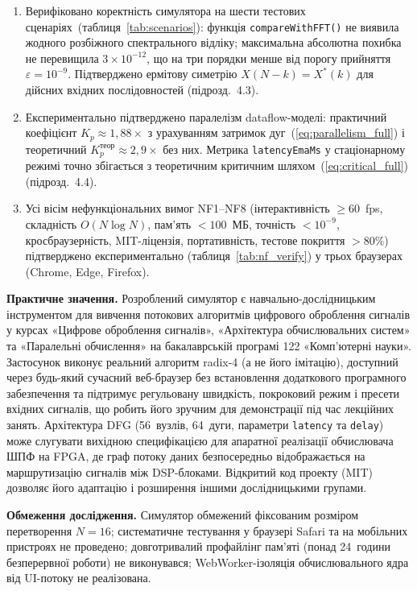 \begin{enumerate}
  \item Верифіковано коректність симулятора на шести тестових
    сценаріях~(таблиця~\ref{tab:scenarios}): функція \texttt{compareWithFFT()}
    не виявила жодного розбіжного спектрального відліку; максимальна
    абсолютна похибка не перевищила $3 \times 10^{-12}$, що на три порядки
    менше від порогу прийняття $\varepsilon = 10^{-9}$. Підтверджено
    ермітову симетрію $X(N-k) = X^*(k)$ для дійсних вхідних послідовностей
    (підрозд.~4.3).

  \item Експериментально підтверджено паралелізм dataflow-моделі: практичний
    коефіцієнт $K_p \approx 1{,}88\times$ з урахуванням затримок
    дуг~(\ref{eq:parallelism_full}) і теоретичний
    $K_p^{\text{теор}} \approx 2{,}9\times$ без них. Метрика
    \texttt{latencyEmaMs} у стаціонарному режимі точно збігається з
    теоретичним критичним шляхом~(\ref{eq:critical_full}) (підрозд.~4.4).

  \item Усі вісім нефункціональних вимог NF1--NF8 (інтерактивність
    $\geq 60$~fps, складність $O(N \log N)$, пам'ять $< 100$~МБ, точність
    $< 10^{-9}$, кросбраузерність, MIT-ліцензія, портативність, тестове
    покриття $> 80\%$) підтверджено експериментально
    (таблиця~\ref{tab:nf_verify}) у трьох браузерах
    (Chrome, Edge, Firefox).
\end{enumerate}

\textbf{Практичне значення.}
Розроблений симулятор є навчально-дослідницьким інструментом для вивчення
потокових алгоритмів цифрового оброблення сигналів у курсах «Цифрове
оброблення сигналів», «Архітектура обчислювальних систем» та «Паралельні
обчислення» на бакалаврській програмі 122 «Комп'ютерні науки». Застосунок
виконує реальний алгоритм radix-4 (а не його імітацію), доступний через
будь-який сучасний веб-браузер без встановлення додаткового програмного
забезпечення та підтримує регульовану швидкість, покроковий режим і
пресети вхідних сигналів, що робить його зручним для демонстрації під час
лекційних занять. Архітектура DFG (56~вузлів, 64~дуги, параметри
\texttt{latency} та \texttt{delay}) може слугувати вихідною специфікацією
для апаратної реалізації обчислювача ШПФ на FPGA, де граф потоку даних
безпосередньо відображається на маршрутизацію сигналів між DSP-блоками.
Відкритий код проекту (MIT) дозволяє його адаптацію і розширення іншими
дослідницькими групами.

\textbf{Обмеження дослідження.}
Симулятор обмежений фіксованим розміром перетворення $N=16$; систематичне
тестування у браузері Safari та на мобільних пристроях не проведено;
довготривалий профайлінг пам'яті (понад 24~години безперервної роботи)
не виконувався; WebWorker-ізоляція обчислювального ядра від UI-потоку
не реалізована.

